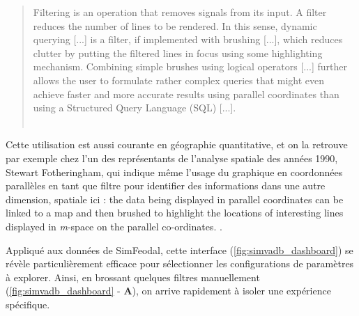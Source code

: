 	\begin{quotation}
		\og Filtering is an operation that removes signals from its input. A filter reduces the number of lines to be rendered. In this sense, dynamic querying [...] is a filter, if implemented with brushing [...], which reduces clutter by putting the filtered lines in focus using some highlighting mechanism. Combining simple brushes using logical operators [...] further allows the user to formulate rather complex queries that might even achieve faster and more accurate results using parallel coordinates than using a Structured Query Language (SQL) [...].\fg{}\\
		\mbox{}~ \hfill \cite[p. 13]{heinrich_state_2013}
	\end{quotation}

	Cette utilisation est aussi courante en géographie quantitative, et on la retrouve par exemple chez l'un des représentants de l'analyse spatiale des années 1990, Stewart Fotheringham, qui indique même l'usage du graphique en coordonnées parallèles en tant que filtre pour identifier des informations dans une autre dimension, spatiale ici : \og the data being displayed in parallel coordinates can be linked to a map and then brushed to highlight the locations of interesting lines displayed in \textit{m}-space on the parallel co-ordinates.\fg{} \autocite{fotheringham_trends_1999}.

	Appliqué aux données de SimFeodal, cette interface (\cref{fig:simvadb_dashboard}) se révèle particulièrement efficace pour sélectionner les configurations de paramètres à explorer.
	Ainsi, en \og brossant \fg{} quelques filtres manuellement (\cref{fig:simvadb_dashboard} - \textbf{A}), on arrive rapidement à isoler une expérience spécifique.

